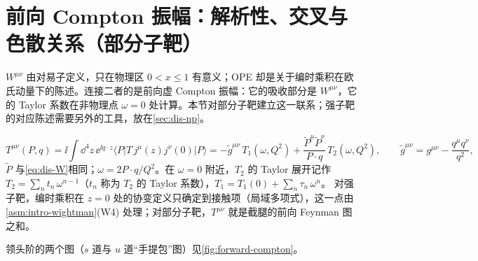 \section{前向 Compton 振幅：解析性、交叉与色散关系（部分子靶）}\label{sec:dis-compton}

$W^{\mu\nu}$ 由对易子定义，只在物理区 $0<x\le1$ 有意义；OPE 却是关于编时乘积在欧氏动量下的陈述。连接二者的是前向虚 Compton 振幅：它的吸收部分是 $W^{\mu\nu}$，它的 Taylor 系数在非物理点 $\omega=0$ 处计算。本节对部分子靶建立这一联系；强子靶的对应陈述需要另外的工具，放在\cref{sec:dis-np}。

\begin{definition}[前向 Compton 振幅]\label{def:dis-compton}
\begin{equation}\label{eq:dis-T}
T^{\mu\nu}(P,q)=\ii\int\dd^4z\,\ee^{\ii q\cdot z}\langle P|T\,j^\mu(z)j^\nu(0)|P\rangle
=-\tilde g^{\mu\nu}\,T_1(\omega,Q^2)+\frac{\tilde P^\mu\tilde P^\nu}{P\cdot q}\,T_2(\omega,Q^2),\qquad \tilde g^{\mu\nu}=g^{\mu\nu}-\frac{q^\mu q^\nu}{q^2},
\end{equation}
$\tilde P$ 与\cref{eq:dis-W}相同；$\omega=2P\cdot q/Q^2$。在 $\omega=0$ 附近，$T_2$ 的 Taylor 展开记作 $T_2=\sum_{n}t_n\,\omega^{n-1}$（$t_n$ 称为 $T_2$ 的 Taylor 系数），$T_1=T_1(0)+\sum_n\tau_n\,\omega^n$。%
对强子靶，编时乘积在 $z=0$ 处的协变定义只确定到接触项（局域多项式），这一点由\cref{asm:intro-wightman}(W4) 处理；对部分子靶，$T^{\mu\nu}$ 就是截腿的前向 Feynman 图之和。
\end{definition}

领头阶的两个图（$s$ 道与 $u$ 道“手提包”图）见\cref{fig:forward-compton}。


